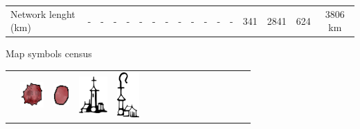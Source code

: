 \documentclass[portrait,a0]{sciposter}
\begin{document}
\begin{minipage}[b]{\textwidth}
\begin{multicols}{3}
\begin{center}
\begin{tabular}{l|cccccccc|c|ccccc|c|c}
        Network lenght (km)&-&-&-&-&-&-&-&-&-&-&-&-&\num{341}&\num{2841}&\num{624}&\num{3806} km 
      \end{tabular}
    \end{center}
    \vfill
    
    \footnotesize
    \begin{center}
      \captionsetup{type=table}
      \caption{Map symbols census}\label{tab:symbols}
      \setcellgapes{1pt}
      \begin{tabular}{cccccccccccccccc}
        &
        \includegraphics[height=28pt]{gfx/ville_couleur.png}&
        \includegraphics[height=25pt]{gfx/bourg_couleur.png}&
        \includegraphics[height=40pt]{gfx/village.pdf}&
        \includegraphics[height=49pt]{gfx/abbaye.pdf}&

\end{tabular}
\end{center}
\end{multicols}
\end{minipage}
\end{document}
